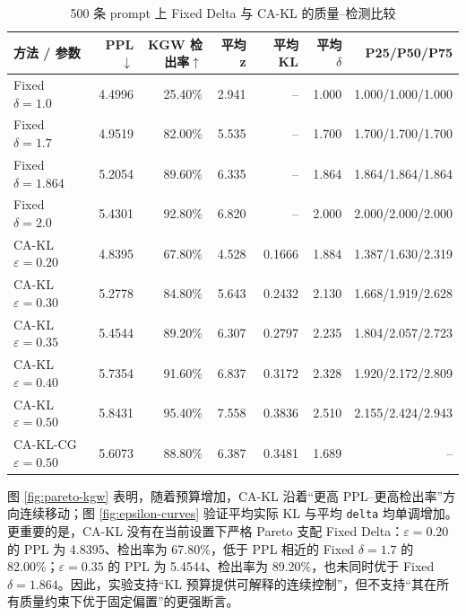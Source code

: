 \documentclass[a4paper,UTF8,zihao=5]{ctexart}
\newcommand{\method}{CA-KL}
\newcommand{\fullmethod}{CA-KL-CG}
\begin{document}
\begin{table}[H]
    \centering
    \caption{500 条 prompt 上 Fixed Delta 与 CA-KL 的质量--检测比较}
    \label{tab:pareto-full}
    \scriptsize
    \setlength{\tabcolsep}{3pt}
    \begin{tabularx}{\textwidth}{p{}rrrrrr}
        \toprule
        方法 / 参数                          & PPL$\downarrow$ & KGW 检出率$\uparrow$ & 平均 z  & 平均 KL  & 平均 $\delta$ & P25/P50/P75       \\
        \midrule
        Fixed $\delta=1.0$               & 4.4996          & 25.40\%           & 2.941 & --     & 1.000       & 1.000/1.000/1.000 \\
        Fixed $\delta=1.7$               & 4.9519          & 82.00\%           & 5.535 & --     & 1.700       & 1.700/1.700/1.700 \\
        Fixed $\delta=1.864$             & 5.2054          & 89.60\%           & 6.335 & --     & 1.864       & 1.864/1.864/1.864 \\
        Fixed $\delta=2.0$               & 5.4301          & 92.80\%           & 6.820 & --     & 2.000       & 2.000/2.000/2.000 \\
        \method{} $\varepsilon=0.20$     & 4.8395          & 67.80\%           & 4.528 & 0.1666 & 1.884       & 1.387/1.630/2.319 \\
        \method{} $\varepsilon=0.30$     & 5.2778          & 84.80\%           & 5.643 & 0.2432 & 2.130       & 1.668/1.919/2.628 \\
        \method{} $\varepsilon=0.35$     & 5.4544          & 89.20\%           & 6.307 & 0.2797 & 2.235       & 1.804/2.057/2.723 \\
        \method{} $\varepsilon=0.40$     & 5.7354          & 91.60\%           & 6.837 & 0.3172 & 2.328       & 1.920/2.172/2.809 \\
        \method{} $\varepsilon=0.50$     & 5.8431          & 95.40\%           & 7.558 & 0.3836 & 2.510       & 2.155/2.424/2.943 \\
        \fullmethod{} $\varepsilon=0.50$ & 5.6073          & 88.80\%           & 6.387 & 0.3481 & 1.689       & --                \\
        \bottomrule
    \end{tabularx}
\end{table}

图 \ref{fig:pareto-kgw} 表明，随着预算增加，CA-KL 沿着“更高 PPL--更高检出率”方向连续移动；图 \ref{fig:epsilon-curves} 验证平均实际 KL 与平均 \texttt{delta} 均单调增加。更重要的是，CA-KL 没有在当前设置下严格 Pareto 支配 Fixed Delta：$\varepsilon=0.20$ 的 PPL 为 4.8395、检出率为 67.80\%，低于 PPL 相近的 Fixed $\delta=1.7$ 的 82.00\%；$\varepsilon=0.35$ 的 PPL 为 5.4544、检出率为 89.20\%，也未同时优于 Fixed $\delta=1.864$。因此，实验支持“KL 预算提供可解释的连续控制”，但不支持“其在所有质量约束下优于固定偏置”的更强断言。
\end{document}
